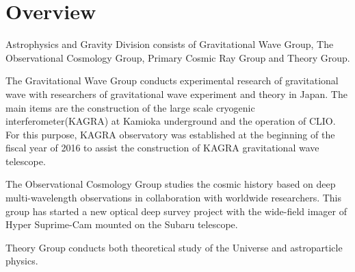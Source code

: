 \twocolumn[
\begin{center}
\vspace{1pc} 
{\bigsf  ASTROPHYSICS AND GRAVITY DIVISION}
\label{astro}
\vspace{20pt}
\end{center}]

\section*{\sf Overview}
\vspace{3pt}
Astrophysics and Gravity Division consists of Gravitational Wave Group, 
The Observational Cosmology Group, Primary Cosmic Ray Group and Theory Group.

The Gravitational Wave Group conducts experimental research of gravitational wave with researchers of gravitational wave experiment and theory in Japan. The main items are the construction of the large scale cryogenic interferometer(KAGRA) at Kamioka underground and the operation of CLIO. For this purpose, KAGRA observatory was established at the beginning of the fiscal year of 2016 to assist the construction of KAGRA gravitational wave telescope. 


The Observational Cosmology Group studies the cosmic history based on deep multi-wavelength observations in collaboration with worldwide researchers. This group has started a new optical deep survey project with the wide-field imager of Hyper Suprime-Cam mounted on the Subaru telescope.

Theory Group conducts both theoretical study of the Universe and astroparticle physics.
\vspace{25pt}

